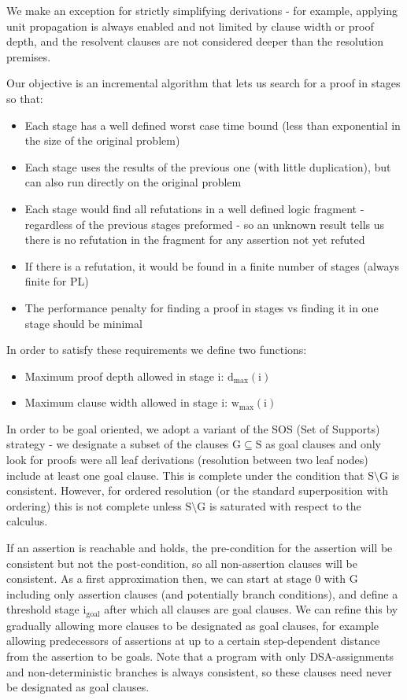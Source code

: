 We make an exception for strictly simplifying derivations - for example, applying unit propagation is always enabled and not limited by clause width or proof depth, and the resolvent clauses are not considered deeper than the resolution premises.

Our objective is an incremental algorithm that lets us search for a proof in stages so that:
\begin{itemize}
	\item Each stage has a well defined worst case time bound (less than exponential in the size of the original problem)
	\item Each stage uses the results of the previous one (with little duplication), but can also run directly on the original problem 
	\item Each stage would find all refutations in a well defined logic fragment - regardless of the previous stages preformed - so an unknown result tells us there is no refutation in the fragment for any assertion not yet refuted
	\item If there is a refutation, it would be found in a finite number of stages (always finite for PL)
	\item The performance penalty for finding a proof in stages vs finding it in one stage should be minimal
\end{itemize}

In order to satisfy these requirements we define two functions:
\begin{itemize}
	\item Maximum proof depth allowed in stage $\mathrm{i}$: $\mathrm{d}_\mathrm{max}(\mathrm{i})$
	\item Maximum clause width allowed in stage $\mathrm{i}$: $\mathrm{w}_\mathrm{max}(\mathrm{i})$
\end{itemize}

In order to be goal oriented, we adopt a variant of the SOS (Set of Supports) strategy - we designate a subset of the clauses $\mathrm{G}\subseteq\mathrm{S}$ as goal clauses and only look for proofs were all leaf derivations (resolution between two leaf nodes) include at least one goal clause. 
This is complete under the condition that $\mathrm{S}\setminus\mathrm{G}$ is consistent. 
However, for ordered resolution (or the standard superposition with ordering) this is not complete unless $\mathrm{S}\setminus\mathrm{G}$ is saturated with respect to the calculus.

If an assertion is reachable and holds, the pre-condition for the assertion will be consistent but not the post-condition, so all non-assertion clauses will be consistent. 
As a first approximation then, we can start at stage 0 with $\mathrm{G}$ including only assertion clauses (and potentially branch conditions), and define a threshold stage $\mathrm{i}_\mathrm{goal}$ after which all clauses are goal clauses.
We can refine this by gradually allowing more clauses to be designated as goal clauses, for example allowing predecessors of assertions at up to a certain step-dependent distance from the assertion to be goals.
Note that a program with only DSA-assignments and non-deterministic branches is always consistent, so these clauses need never be designated as goal clauses.

